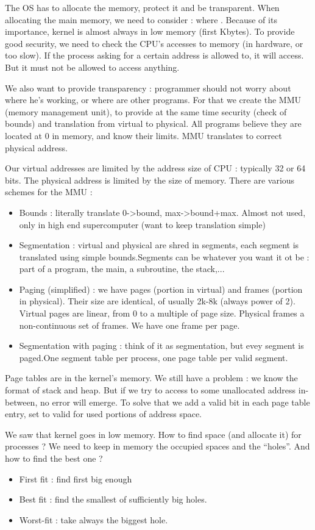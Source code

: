 \documentclass[12pt,a4paper]{article}
\begin{document}
The OS has to allocate the memory, protect it and be transparent. When allocating the main memory, we need to consider : where . Because of its importance, kernel is almost always in low memory (first Kbytes). To provide good security, we need to check the CPU's accesses to memory (in hardware, or too slow). If the process asking for a certain address is allowed to, it will access. But it must not be allowed to access anything.

We also want to provide transparency : programmer should not worry about where he's working, or where are other programs. For that we create the MMU (memory management unit), to provide at the same time security (check of bounds) and translation from virtual to physical. All programs believe they are located at 0 in memory, and know their limits. MMU translates to correct physical address. 

Our virtual addresses are limited by the address size of CPU : typically 32 or 64 bits. The physical address is limited by the size of memory. There are various schemes for the MMU : 
\begin{itemize}
    \item Bounds : literally translate 0->bound, max->bound+max. Almost not used, only in high end supercomputer (want to keep translation simple)
    \item Segmentation : virtual and physical are shred in segments, each segment is translated using simple bounds.Segments can be whatever you want it ot be : part of a program, the main, a subroutine, the stack,...
    \item Paging (simplified) : we have pages (portion in virtual) and frames (portion in physical). Their size are identical, of usually 2k-8k (always power of 2). Virtual pages are linear, from 0 to a multiple of page size. Physical frames a non-continuous set of frames. We have one frame per page. 
    \item Segmentation with paging : think of it as segmentation, but evey segment is paged.One segment table per process, one page table per valid segment.
\end{itemize}
Page tables are in the kernel's memory. We still have a problem : we know the format of stack and heap. But if we try to access to some unallocated address in-between, no error will emerge. To solve that we add a valid bit in each page table entry, set to valid for used portions of address space. 

We saw that kernel goes in low memory. How to find space (and allocate it) for processes ? We need to keep in memory the occupied spaces and the ``holes''. And how to find the best one ? 
\begin{itemize}
    \item First fit : find first big enough
    \item Best fit : find the smallest of sufficiently big holes.
    \item Worst-fit : take always the biggest hole. 
\end{itemize}
\end{document}

